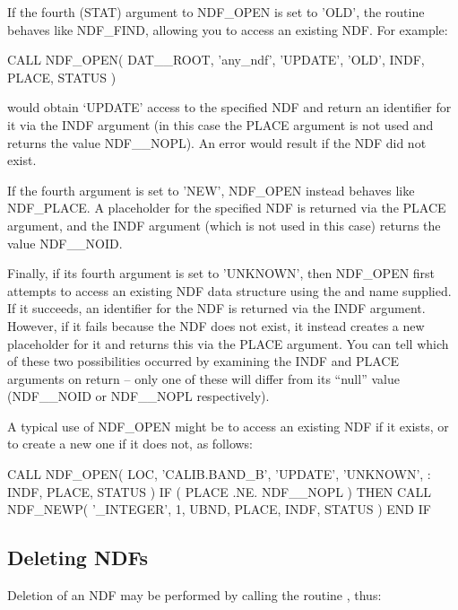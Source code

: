 \documentclass[twoside,11pt,nolof]{starlink}
\begin{document}
If the fourth (STAT) argument to NDF\_OPEN is set to 'OLD', the routine
behaves like NDF\_FIND, allowing you to access an existing NDF.  For
example:

\small
\begin{terminalv}
      CALL NDF_OPEN( DAT__ROOT, 'any_ndf', 'UPDATE', 'OLD', INDF, PLACE, STATUS )
\end{terminalv}
\normalsize

would obtain `UPDATE' access to the specified NDF and return an
identifier for it via the INDF argument (in this case the PLACE
argument is not used and returns the value NDF\_\_NOPL).  An error
would result if the NDF did not exist.

If the fourth argument is set to 'NEW', NDF\_OPEN instead behaves like
NDF\_PLACE. A placeholder for the specified NDF is returned via the
PLACE argument, and the INDF argument (which is not used in this case)
returns the value NDF\_\_NOID.

Finally, if its fourth argument is set to 'UNKNOWN', then NDF\_OPEN
first attempts to access an existing NDF data structure using the
 and name supplied. If it
succeeds, an identifier for the NDF
is returned via the INDF argument. However, if it fails because the
NDF does not exist, it instead creates a new placeholder for it and
returns this via the PLACE argument. You can tell which of these two
possibilities occurred by examining the INDF and PLACE arguments on
return -- only one of these will differ from its ``null'' value
(NDF\_\_NOID or NDF\_\_NOPL respectively).

A typical use of NDF\_OPEN might be to access an existing NDF if it
exists, or to create a new one if it does not, as follows:

\small
\begin{terminalv}
      CALL NDF_OPEN( LOC, 'CALIB.BAND_B', 'UPDATE', 'UNKNOWN',
     :               INDF, PLACE,  STATUS )
      IF ( PLACE .NE. NDF__NOPL ) THEN
         CALL NDF_NEWP( '_INTEGER', 1, UBND, PLACE, INDF, STATUS )
      END IF
\end{terminalv}
\normalsize

\subsection{\label{ss:delet}Deleting NDFs}

Deletion of an NDF may be performed by calling the routine , thus:
\end{document}
